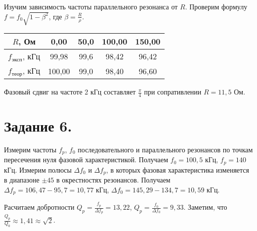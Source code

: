 	Изучим зависимость частоты параллельного резонанса от $R$. Проверим формулу $f = f_0 \sqrt{1 - \beta^2}$, где $\beta = \frac{R}{\rho}$.

	\begin{table}[h!]
		\begin{center}
			\begin{tabular}{|c|c|c|c|c|}
				\hline
				$R$, Ом                  & 0,00   & 50,0 & 100,00  & 150,00  \\ \hline
				$f_{\text{эксп}}$, кГц   & 99,98  & 99,6 & 98,42   & 96,42   \\ \hline
				$f_{\text{теор}}$, кГц   & 100,00 & 99,0 & 98,40   & 96,60   \\ \hline
			\end{tabular}
		\end{center}
	\end{table}


	Фазовый сдвиг на частоте 2 кГц составляет $\frac{\pi}{4}$ при сопративлении $R = 11,5$ Ом.


	\section*{Задание 6.}

	\noindent Измерим частоты $f_p$, $f_0$ последовательного и параллельного резонансов по точкам пересечения нуля фазовой характеристикой.
	Получаем $f_0 = 100,5$ кГц, $f_p = 140$ кГц.
	Измерим полюсы $\Delta f_0$ и $\Delta f_p$, в которых фазовая характеристика изменяется в диапазоне $\pm 45$ в окрестностях
	резонансов. Получаем $\Delta f_p = 106,47 - 95,7 = 10,77$ кГц, $\Delta f_0 = 145,29 - 134,7 = 10,59$ кГц. 

	\noindent Расчитаем добротности $Q_p = \frac{f_p}{\Delta f_p} = 13,22$, $Q_p = \frac{f_0}{\Delta f_0} = 9,33$.
	Заметим, что $\frac{Q_p}{Q_0} \approx 1,41 \approx \sqrt{2}$.


